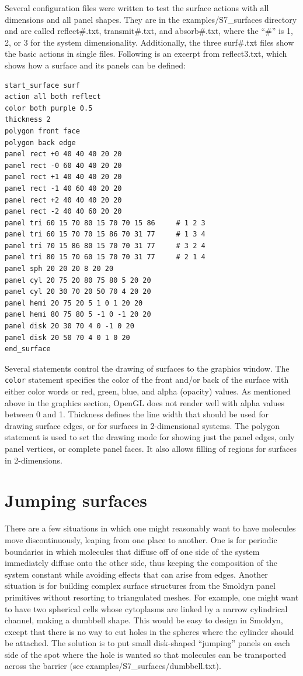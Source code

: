 \documentclass {book}
\newcommand {\ttt} {\texttt}
\begin{document}
Several configuration files were written to test the surface actions with all dimensions and all panel shapes. They are in the examples/S7\_surfaces directory and are called reflect\#.txt, transmit\#.txt, and absorb\#.txt, where the ``\#'' is 1, 2, or 3 for the system dimensionality. Additionally, the three surf\#.txt files show the basic actions in single files. Following is an excerpt from reflect3.txt, which shows how a surface and its panels can be defined:

\begin{lstlisting}[style=SSAC]
start_surface surf
action all both reflect
color both purple 0.5
thickness 2
polygon front face
polygon back edge
panel rect +0 40 40 40 20 20
panel rect -0 60 40 40 20 20
panel rect +1 40 40 40 20 20
panel rect -1 40 60 40 20 20
panel rect +2 40 40 40 20 20
panel rect -2 40 40 60 20 20
panel tri 60 15 70 80 15 70 70 15 86     # 1 2 3
panel tri 60 15 70 70 15 86 70 31 77     # 1 3 4
panel tri 70 15 86 80 15 70 70 31 77     # 3 2 4
panel tri 80 15 70 60 15 70 70 31 77     # 2 1 4
panel sph 20 20 20 8 20 20
panel cyl 20 75 20 80 75 80 5 20 20
panel cyl 20 30 70 20 50 70 4 20 20
panel hemi 20 75 20 5 1 0 1 20 20
panel hemi 80 75 80 5 -1 0 -1 20 20
panel disk 20 30 70 4 0 -1 0 20
panel disk 20 50 70 4 0 1 0 20
end_surface
\end{lstlisting}

Several statements control the drawing of surfaces to the graphics window. The \ttt{color} statement specifies the color of the front and/or back of the surface with either color words or red, green, blue, and alpha (opacity) values. As mentioned above in the graphics section, OpenGL does not render well with alpha values between 0 and 1. Thickness defines the line width that should be used for drawing surface edges, or for surfaces in 2-dimensional systems. The polygon statement is used to set the drawing mode for showing just the panel edges, only panel vertices, or complete panel faces. It also allows filling of regions for surfaces in 2-dimensions.

\section{Jumping surfaces}

There are a few situations in which one might reasonably want to have molecules move discontinuously, leaping from one place to another. One is for periodic boundaries in which molecules that diffuse off of one side of the system immediately diffuse onto the other side, thus keeping the composition of the system constant while avoiding effects that can arise from edges. Another situation is for building complex surface structures from the Smoldyn panel primitives without resorting to triangulated meshes. For example, one might want to have two spherical cells whose cytoplasms are linked by a narrow cylindrical channel, making a dumbbell shape. This would be easy to design in Smoldyn, except that there is no way to cut holes in the spheres where the cylinder should be attached. The solution is to put small disk-shaped ``jumping'' panels on each side of the spot where the hole is wanted so that molecules can be transported across the barrier (see examples/S7\_surfaces/dumbbell.txt).
\end{document}

